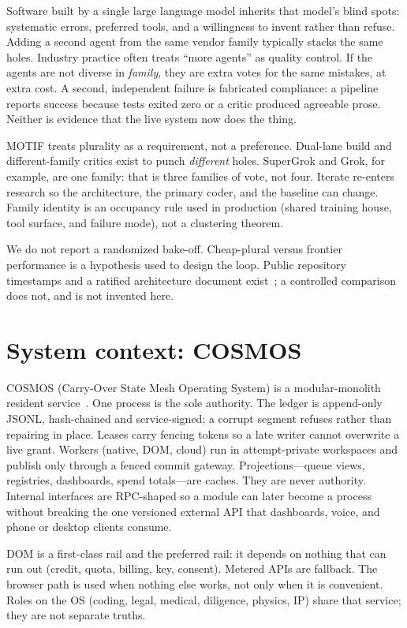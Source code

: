 \documentclass[11pt]{article}
\begin{document}
Software built by a single large language model inherits that model's
blind spots: systematic errors, preferred tools, and a willingness to
invent rather than refuse. Adding a second agent from the same vendor
family typically stacks the same holes. Industry practice often treats
``more agents'' as quality control. If the agents are not diverse in
\emph{family}, they are extra votes for the same mistakes, at extra
cost. A second, independent failure is fabricated compliance: a
pipeline reports success because tests exited zero or a critic produced
agreeable prose. Neither is evidence that the live system now does the
thing.

MOTIF treats plurality as a requirement, not a preference. Dual-lane
build and different-family critics exist to punch \emph{different}
holes. SuperGrok and Grok, for example, are one family: that is three
families of vote, not four. Iterate re-enters research so the
architecture, the primary coder, and the baseline can change. Family
identity is an occupancy rule used in production (shared training
house, tool surface, and failure mode), not a clustering theorem.

We do not report a randomized bake-off. Cheap-plural versus frontier
performance is a hypothesis used to design the loop. Public repository
timestamps and a ratified architecture document exist~\cite{cosmosarch};
a controlled comparison does not, and is not invented here.

\section{System context: COSMOS}

COSMOS (Carry-Over State Mesh Operating System) is a modular-monolith
resident service~\cite{cosmosarch}. One process is the sole authority.
The ledger is append-only JSONL, hash-chained and service-signed; a
corrupt segment refuses rather than repairing in place. Leases carry
fencing tokens so a late writer cannot overwrite a live grant. Workers
(native, DOM, cloud) run in attempt-private workspaces and publish only
through a fenced commit gateway. Projections---queue views, registries,
dashboards, spend totals---are caches. They are never authority.
Internal interfaces are RPC-shaped so a module can later become a
process without breaking the one versioned external API that
dashboards, voice, and phone or desktop clients consume.

DOM is a first-class rail and the preferred rail: it depends on
nothing that can run out (credit, quota, billing, key, consent).
Metered APIs are fallback. The browser path is used when nothing else
works, not only when it is convenient. Roles on the OS (coding, legal,
medical, diligence, physics, IP) share that service; they are not
separate truths.
\end{document}
